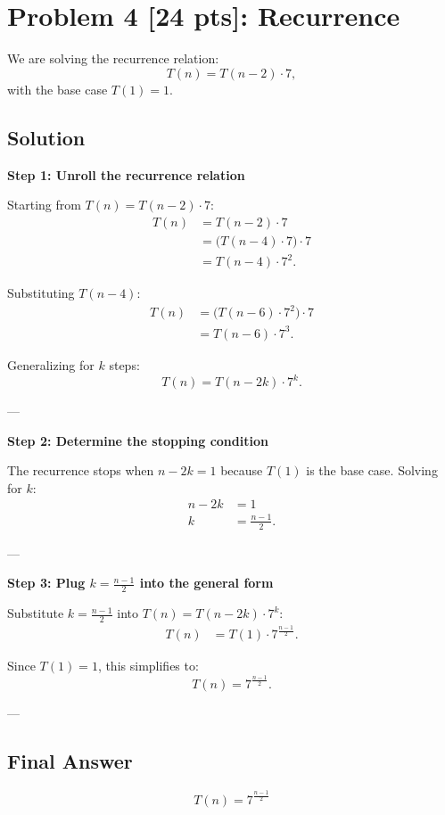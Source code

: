 \documentclass[10pt]{article}
\begin{document}
\newpage

\section*{Problem 4 [24 pts]: Recurrence}

We are solving the recurrence relation:
\[
  T(n) = T(n-2) \cdot 7,
\]
with the base case \( T(1) = 1 \).

\subsection*{Solution}

\textbf{Step 1: Unroll the recurrence relation}

Starting from \( T(n) = T(n-2) \cdot 7 \):
\begin{align*}
  T(n) &= T(n-2) \cdot 7 \\
  &= \big(T(n-4) \cdot 7\big) \cdot 7 \\
  &= T(n-4) \cdot 7^2.
\end{align*}

Substituting \( T(n-4) \):
\begin{align*}
  T(n) &= \big(T(n-6) \cdot 7^2\big) \cdot 7 \\
  &= T(n-6) \cdot 7^3.
\end{align*}

Generalizing for \( k \) steps:
\[
  T(n) = T(n-2k) \cdot 7^k.
\]

---

\textbf{Step 2: Determine the stopping condition}

The recurrence stops when \( n - 2k = 1 \) because \( T(1) \) is the base case. Solving for \( k \):
\begin{align*}
  n - 2k &= 1 \\
  k &= \frac{n-1}{2}.
\end{align*}

---

\textbf{Step 3: Plug \( k = \frac{n-1}{2} \) into the general form}

Substitute \( k = \frac{n-1}{2} \) into \( T(n) = T(n-2k) \cdot 7^k \):
\begin{align*}
  T(n) &= T(1) \cdot 7^{\frac{n-1}{2}}.
\end{align*}

Since \( T(1) = 1 \), this simplifies to:
\[
  T(n) = 7^{\frac{n-1}{2}}.
\]

---

\subsection*{Final Answer}
\[
  T(n) = 7^{\frac{n-1}{2}}
\]
\end{document}
